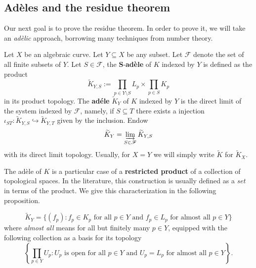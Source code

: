\subsection{Adèles and the residue theorem}
Our next goal is to prove the residue theorem. In order to prove it, we will take an \textit{adèlic} approach, borrowing many techniques from number theory.
\begin{definition}\label{def:adele-ring-over-algebraic-curve}
	Let $X$ be an algebraic curve. Let $Y \subseteq X$ be any subset. Let $\mathscr{F}$ denote the set of all finite subsets of $Y$. Let $S \in \mathscr{F}$, the $\mathbf{S}$-\textbf{adèle} of $K$ indexed by $Y$ is defined as the product
	\[
		\widetilde{K}_{Y,S} := \prod_{p\in Y\setminus S}L_{p} \times \prod_{p\in S}K_{p}
	\]
	in its product topology. The \textbf{adéle} $\widetilde{K}_{Y}$ of $K$ indexed by $Y$ is the direct limit of the system indexed by $\mathscr{F}$, namely, if $S \subseteq T$ there exists a injection $\iota_{ST}\colon \widetilde{K}_{Y,S} \hookrightarrow \widetilde{K}_{Y,T}$ given by the inclusion. Endow
	\[
		\widetilde{K}_{Y} = \varinjlim_{S \in \mathscr{F}} \widetilde{K}_{Y,S}
	\]
	with its direct limit topology. Usually, for $X = Y$ we will simply write $\widetilde{K}$ for $\widetilde{K}_{X}$.
\end{definition}
The adèle of $K$ is a particular case of a \textbf{restricted product} of a collection of topological spaces. In the literature, this construction is usually defined as a \textit{set} in terms of the product. We give this characterization in the following proposition.
\begin{proposition}\label{prop:adèle-as-subset-of-product}
	\[
		\widetilde{K}_{Y} = \{(f_{p})\colon f_{p} \in K_{p}\text{ for all }p \in Y\text{ and }f_{p}\in L_{p}\text{ for almost all }p\in Y\}
	\]
	where \textit{almost all} means for all but finitely many $p\in Y$, equipped with the following collection as a basis for its topology
	\[
		\left\{\prod_{p\in Y} U_{p} \colon U_{p}\text{ is open for all }p\in Y\text{ and }U_{p} = L_{p}\text{ for almost all }p\in Y\right\}.
	\]
\end{proposition}
